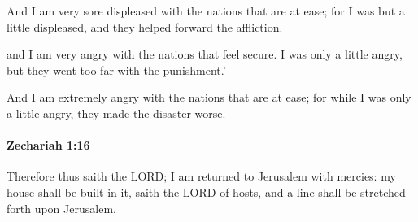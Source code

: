 			\begin{versebox}
					\item[BHS] 
					\item[LXX] 
					\item[ASV] And I am very sore displeased with the nations that are at ease; for I was but a little displeased, and they helped forward the affliction.
					\item[NIV] and I am very angry with the nations that feel secure. I was only a little angry, but they went too far with the punishment.’
					\item[NRSV] And I am extremely angry with the nations that are at ease; for while I was only a little angry, they made the disaster worse.
			\end{versebox}

		\paragraph{Zechariah 1:16} %
			\label{ZECHARIAH-1-16}

			Therefore thus saith the LORD; I am returned to Jerusalem with mercies: my house shall be built in it, saith the LORD of hosts, and a line shall be stretched forth upon Jerusalem.

